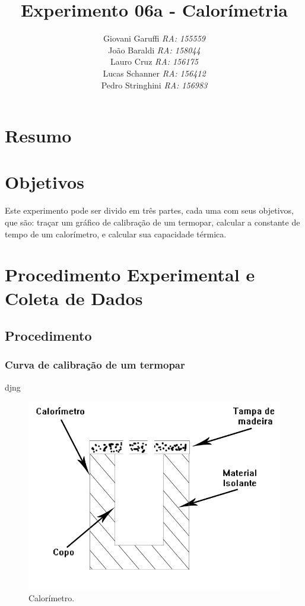 \documentclass[12pt,a4paper]{article}
\begin{document}
\title{\vspace{70mm}\Huge Experimento 06a - Calorímetria}
\author{ Giovani Garuffi\qquad\hfill
		\textit {RA: 155559}\protect\\
		João Baraldi\hfill
		\textit{RA: 158044}\protect\\
		Lauro Cruz\hfill
		\textit{RA: 156175}\protect\\
		Lucas Schanner\hfill
		\textit{RA: 156412}\protect\\
		Pedro Stringhini\hfill
		\textit {RA: 156983}								
		}
\maketitle
\newpage
\section{Resumo}


\section{Objetivos}
Este experimento pode ser divido em três partes, cada uma com seus objetivos, que são: traçar um gráfico de calibração de um termopar, calcular a constante de tempo de um calorímetro, e calcular sua capacidade térmica.


\section{Procedimento Experimental e Coleta de Dados}


\subsection{Procedimento}


\subsubsection{Curva de calibração de um termopar}
djng
\begin{figure}[!htbp]
\centering
\includegraphics[scale=0.3]{Fig6a1.jpg}
\caption{Calorímetro.}
\label{calorimetro}
\end{figure}
\end{document}
